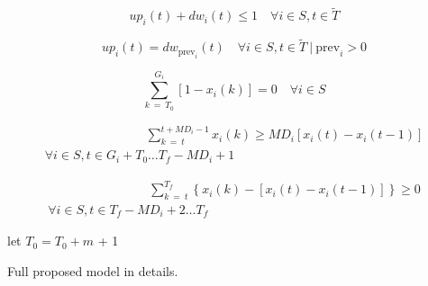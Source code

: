 \begin{algorithm}[htb]
{\begin{equation}
up_i(t) + dw_i(t) \leq 1 \quad \forall i \in S, t \in \tilde{T}
\end{equation}

\begin{equation}
    up_i(t) = dw_{\text{prev}_i}(t) \quad \forall i \in S, t \in \tilde{T} \ | \ \text{prev}_i>0
\end{equation}

\begin{equation}
    \sum_{k\ =\ T_0}^{G_i} \left[ 1 - x_i(k) \right] = 0 \quad \forall i \in S
\end{equation}

\begin{multline}
 \qquad \qquad \qquad \qquad    \sum_{k\ =\ t}^{t+MD_i-1} x_i(k) \geq MD_i \left[ x_i(t) - x_i(t-1) \right] \\
    \forall i \in S, t \in G_i + T_0 \hdots T_f - {MD}_i + 1
\end{multline}

\begin{multline}
 \qquad \qquad \qquad \qquad \sum_{k\ =\ t}^{T_f} \left\{ x_i(k) - \left[ x_i(t) - x_i(t-1) \right] \right\} \geq 0 \\
    \forall i \in S, t \in T_f - MD_i + 2 \hdots T_f
\end{multline}
 

let $T_0 = T_0 +m$ + 1
 }
\caption{Full proposed model in details.}
\end{algorithm}
